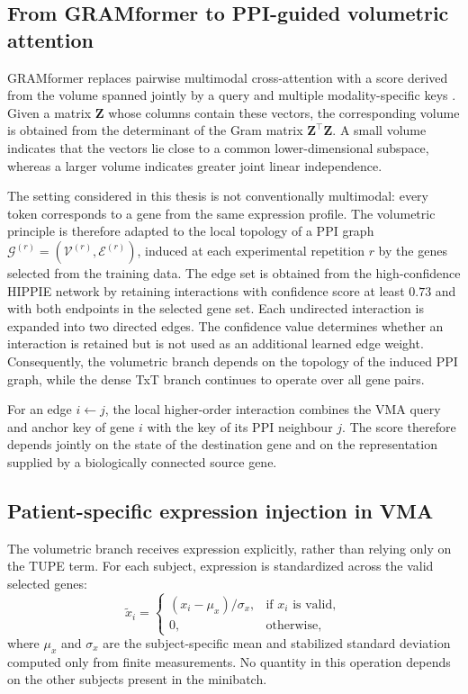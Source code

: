 \subsection{From GRAMformer to PPI-guided volumetric attention}

GRAMformer replaces pairwise multimodal cross-attention with a score derived from the volume spanned jointly by a query and multiple modality-specific keys \cite{cicchetti2026gramformer}. Given a matrix \(\mathbf{Z}\) whose columns contain these vectors, the corresponding volume is obtained from the determinant of the Gram matrix \(\mathbf{Z}^{\top}\mathbf{Z}\). A small volume indicates that the vectors lie close to a common lower-dimensional subspace, whereas a larger volume indicates greater joint linear independence.

The setting considered in this thesis is not conventionally multimodal: every token corresponds to a gene from the same expression profile. The volumetric principle is therefore adapted to the local topology of a PPI graph \(\mathcal{G}^{(r)}=(\mathcal{V}^{(r)},\mathcal{E}^{(r)})\), induced at each experimental repetition \(r\) by the genes selected from the training data. The edge set is obtained from the high-confidence HIPPIE network by retaining interactions with confidence score at least \(0.73\) and with both endpoints in the selected gene set. Each undirected interaction is expanded into two directed edges. The confidence value determines whether an interaction is retained but is not used as an additional learned edge weight. Consequently, the volumetric branch depends on the topology of the induced PPI graph, while the dense TxT branch continues to operate over all gene pairs.

For an edge \(i\leftarrow j\), the local higher-order interaction combines the VMA query and anchor key of gene \(i\) with the key of its PPI neighbour \(j\). The score therefore depends jointly on the state of the destination gene and on the representation supplied by a biologically connected source gene.

\subsection{Patient-specific expression injection in VMA}

The volumetric branch receives expression explicitly, rather than relying only on the TUPE term. For each subject, expression is standardized across the valid selected genes:
\begin{equation}
    \widetilde{x}_i
    =
    \begin{cases}
        (x_i-\mu_x)/\sigma_x, & \text{if }x_i\text{ is valid},\\
        0,                    & \text{otherwise},
    \end{cases}
\end{equation}
where \(\mu_x\) and \(\sigma_x\) are the subject-specific mean and stabilized standard deviation computed only from finite measurements. No quantity in this operation depends on the other subjects present in the minibatch.

